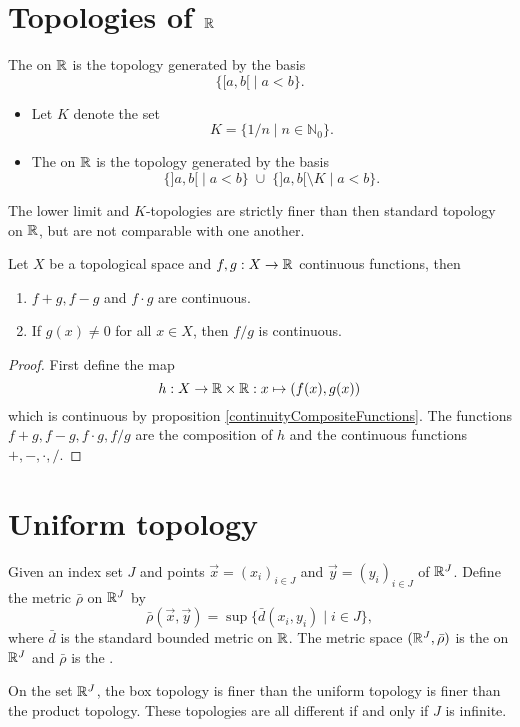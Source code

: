 \section{Topologies of $\mathbb{R}$}
\begin{definition}
The  on $\mathbb{R}$ is the topology generated by the basis
\[ \{ [a,b[ \;|\; a< b \}. \]
\end{definition}
\begin{definition}
\begin{itemize}
\item Let $K$ denote the set
\[ K = \{1/n \;|\; n\in \mathbb{N}_0\}. \]
\item The  on $\mathbb{R}$ is the topology generated by the basis
\[ \{ ]a,b[ \;|\; a< b \}\;\cup\;\{ ]a,b[\setminus K \;|\; a< b \}. \]
\end{itemize}
\end{definition}
\begin{lemma}
The lower limit and $K$-topologies are strictly finer than then standard topology on $\mathbb{R}$, but are not comparable with one another.
\end{lemma}
\begin{proposition}
Let $X$ be a topological space and $f,g:X\to \mathbb{R}$ continuous functions, then
\begin{enumerate}
\item $f+g, f-g$ and $f\cdot g$ are continuous.
\item If $g(x)\neq 0$ for all $x\in X$, then $f/g$ is continuous.
\end{enumerate}
\end{proposition}
\begin{proof}
First define the map
\[ h:X\to \mathbb{R}\times\mathbb{R}: x\mapsto (f(x),g(x)) \]
which is continuous by proposition \ref{continuityCompositeFunctions}. The functions $f+g,f-g,f\cdot g, f/g$ are the composition of $h$ and the continuous functions $+,-,\cdot,/$.
\end{proof}

\section{Uniform topology}
\begin{definition}
Given an index set $J$ and points $\vec{x}=(x_i)_{i\in J}$ and $\vec{y}=(y_i)_{i\in J}$ of $\mathbb{R}^J$. Define the metric $\bar{\rho}$ on $\mathbb{R}^J$ by
\[ \bar{\rho}(\vec{x}, \vec{y}) = \sup\{\bar{d}(x_i,y_i)\;|\; i\in J\}, \]
where $\bar{d}$ is the standard bounded metric on $\mathbb{R}$. The metric space $(\mathbb{R}^J, \bar{\rho})$ is the  on $\mathbb{R}^J$ and $\bar{\rho}$ is the .
\end{definition}
\begin{proposition}
On the set $\mathbb{R}^J$, the box topology is finer than the uniform topology is finer than the product topology. These topologies are all different \textup{if and only if} $J$ is infinite.
\end{proposition}

